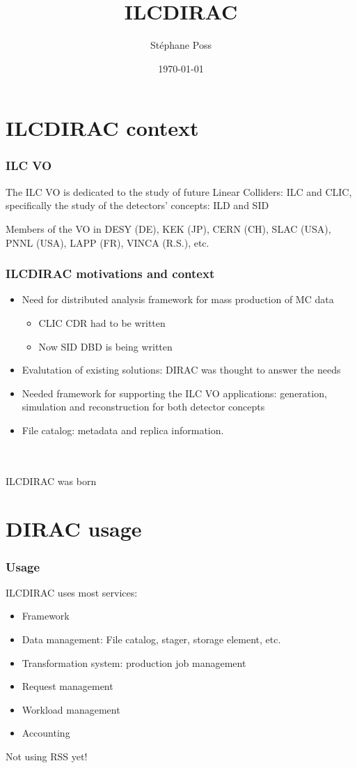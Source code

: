 \documentclass{beamer}
\title{ILCDIRAC}
\author{St\'ephane Poss}
\institute[CERN]
{
 CERN
}
\date{\today}
\begin{document}
\begin{frame}
\titlepage
\end{frame}

\begin{frame}
  \tableofcontents
\end{frame}

\section{ILCDIRAC context}
\label{sec:context}

\begin{frame}
  \frametitle{ILC VO}
The {\color{blue} ILC VO} is dedicated to the study of \alert{future
  Linear Colliders: ILC and CLIC}, specifically the study of the
detectors' concepts: ILD and SID

Members of the VO in DESY (DE), KEK (JP), CERN (CH), SLAC (USA), PNNL
(USA), LAPP (FR), VINCA (R.S.), etc.
\end{frame}

\begin{frame}
  \frametitle{ILCDIRAC motivations and context}
  \begin{itemize}
  \item Need for distributed analysis framework for mass production of
    MC data
    \begin{itemize}
    \item CLIC CDR had to be written
    \item Now SID DBD is being written
    \end{itemize}
  \item Evalutation of existing solutions: DIRAC was thought to
    answer the needs
  \item Needed framework for supporting the ILC VO applications:
    generation, simulation and reconstruction for both detector concepts 
  \item File catalog: metadata and replica information.
  \end{itemize}
~\\
~\\
\hspace{4cm} 
\alert{ILCDIRAC was born}

\end{frame}

\section{DIRAC usage}
\begin{frame}
  \frametitle{Usage}
ILCDIRAC uses most services:
\begin{itemize}
\item Framework
\item Data management: File catalog, stager, storage element, etc.
\item Transformation system: production job management
\item Request management
\item Workload management
\item Accounting
\end{itemize}
Not using RSS yet!
\end{frame}
\end{document}
